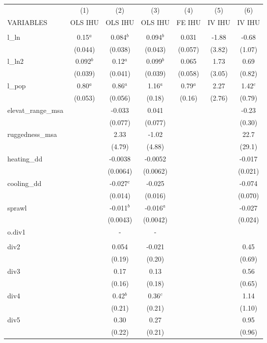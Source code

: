 \documentclass[]{article}
\begin{document}
\begin{tabular}{lcccccc} \hline
 & (1) & (2) & (3) & (4) & (5) & (6) \\
VARIABLES & OLS IHU & OLS IHU & OLS IHU & FE IHU & IV IHU & IV IHU \\ \hline
 &  &  &  &  &  &  \\
l\_ln & 0.15$^a$ & 0.084$^b$ & 0.094$^b$ & 0.031 & -1.88 & -0.68 \\
 & (0.044) & (0.038) & (0.043) & (0.057) & (3.82) & (1.07) \\
l\_ln2 & 0.092$^b$ & 0.12$^a$ & 0.099$^b$ & 0.065 & 1.73 & 0.69 \\
 & (0.039) & (0.041) & (0.039) & (0.058) & (3.05) & (0.82) \\
l\_pop & 0.80$^a$ & 0.86$^a$ & 1.16$^a$ & 0.79$^a$ & 2.27 & 1.42$^c$ \\
 & (0.053) & (0.056) & (0.18) & (0.16) & (2.76) & (0.79) \\
elevat\_range\_msa &  & -0.033 & 0.041 &  &  & -0.23 \\
 &  & (0.077) & (0.077) &  &  & (0.30) \\
ruggedness\_msa &  & 2.33 & -1.02 &  &  & 22.7 \\
 &  & (4.79) & (4.88) &  &  & (29.1) \\
heating\_dd &  & -0.0038 & -0.0052 &  &  & -0.017 \\
 &  & (0.0064) & (0.0062) &  &  & (0.021) \\
cooling\_dd &  & -0.027$^c$ & -0.025 &  &  & -0.074 \\
 &  & (0.014) & (0.016) &  &  & (0.070) \\
sprawl &  & -0.011$^b$ & -0.016$^a$ &  &  & -0.027 \\
 &  & (0.0043) & (0.0042) &  &  & (0.024) \\
o.div1 &  & - & - &  &  &  \\
 &  &  &  &  &  &  \\
div2 &  & 0.054 & -0.021 &  &  & 0.45 \\
 &  & (0.19) & (0.20) &  &  & (0.69) \\
div3 &  & 0.17 & 0.13 &  &  & 0.56 \\
 &  & (0.16) & (0.18) &  &  & (0.65) \\
div4 &  & 0.42$^b$ & 0.36$^c$ &  &  & 1.14 \\
 &  & (0.21) & (0.21) &  &  & (1.10) \\
div5 &  & 0.30 & 0.27 &  &  & 0.95 \\
 &  & (0.22) & (0.21) &  &  & (0.96) \\

\end{tabular}
\end{document}
